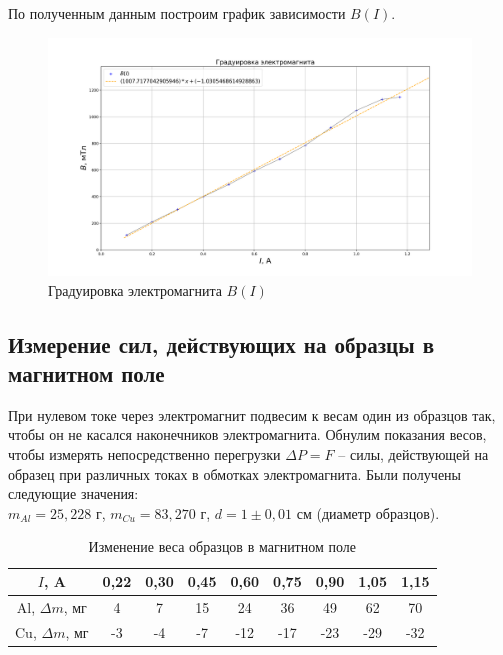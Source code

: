 \documentclass{lab}
\begin{document}
По полученным данным построим график зависимости $ B(I)$.

\begin{figure}[h!]
    \centering
    \includegraphics[width = \textwidth]{Graduation.png}
    \caption{Градуировка электромагнита $B(I)$}
\end{figure}

\subsection*{Измерение сил, действующих на образцы в магнитном поле}

При нулевом токе через электромагнит подвесим к весам один из образцов так, чтобы он не касался наконечников электромагнита. Обнулим показания весов, чтобы измерять непосредственно перегрузки $ \Delta P = F $ -- силы, действующей на образец при различных токах в обмотках электромагнита. Были получены следующие значения:\\
$m_{Al} = 25,228$ г, $m_{Cu} = 83,270$ г, $d = 1 \pm 0,01$ см (диаметр образцов).
\begin{table}[h!]
    \centering
    \begin{tabular}{|c|c|c|c|c|c|c|c|c|}
        \hline
        $I$, A & 0,22 & 0,30 & 0,45 & 0,60 & 0,75 & 0,90 & 1,05 & 1,15 \\ \hline
        Al, $\Delta m$, мг & 4 & 7 & 15 & 24 & 36 & 49 & 62 & 70 \\ \hline
        Cu, $\Delta m$, мг & -3 & -4 & -7 & -12 & -17 & -23 & -29 & -32 \\ \hline
    \end{tabular}
    \caption{Изменение веса образцов в магнитном поле}
\end{table}
\end{document}

